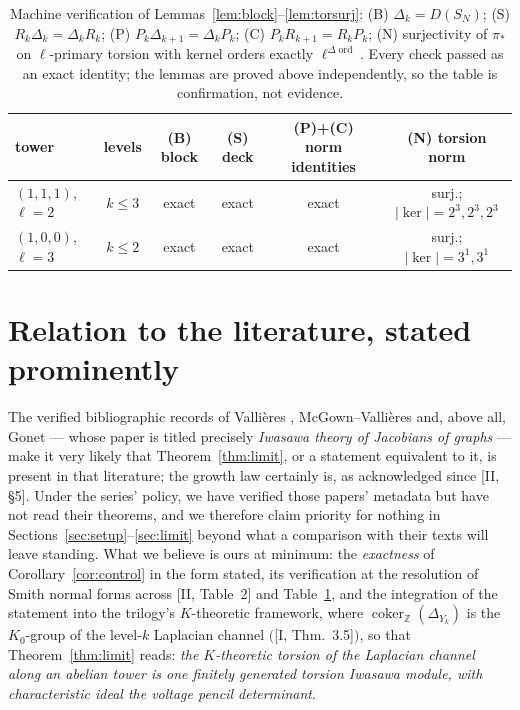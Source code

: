 \documentclass[11pt]{amsart}
\numberwithin{equation}{section}
\theoremstyle{definition}
\theoremstyle{remark}
\newcommand{\Z}{\mathbb{Z}}
\newcommand{\coker}{\operatorname{coker}}
\newcommand{\ord}{\operatorname{ord}}
\begin{document}
\begin{table}[ht]
\centering\small
\renewcommand{\arraystretch}{1.2}
\begin{tabular}{lccccc}
\toprule
tower & levels & (B) block & (S) deck & (P)+(C) norm identities & (N) torsion norm\\
\midrule
$(1,1,1)$, $\ell=2$ & $k\le3$ & exact & exact & exact & surj.; $|\ker|=2^3,2^3,2^3$\\
$(1,0,0)$, $\ell=3$ & $k\le2$ & exact & exact & exact & surj.; $|\ker|=3^1,3^1$\\
\bottomrule
\end{tabular}
\medskip
\caption{Machine verification of Lemmas~\ref{lem:block}--\ref{lem:torsurj}:
(B) $\Delta_k=D(S_N)$; (S) $R_k\Delta_k=\Delta_kR_k$; (P) $P_k\Delta_{k+1}
=\Delta_kP_k$; (C) $P_kR_{k+1}=R_kP_k$; (N) surjectivity of $\pi_*$ on
$\ell$-primary torsion with kernel orders exactly
$\ell^{\Delta\ord}$. Every check passed as an exact identity; the lemmas are proved
above independently, so the table is confirmation, not evidence.}
\label{tab:battery}
\end{table}

\section{Relation to the literature, stated prominently}\label{sec:lit}

The verified bibliographic records of Vallières \cite{Vallieres}, McGown--Vallières
\cite{McGownVallieres} and, above all, Gonet --- whose paper is titled precisely
\emph{Iwasawa theory of Jacobians of graphs} \cite{Gonet} --- make it very likely
that Theorem~\ref{thm:limit}, or a statement equivalent to it, is present in that
literature; the growth law certainly is, as acknowledged since [II, \S5]. Under the
series' policy, we have verified those papers' metadata but have not read their
theorems, and we therefore claim priority for nothing in
Sections~\ref{sec:setup}--\ref{sec:limit} beyond what a comparison with their texts
will leave standing. What we believe is ours at minimum: the \emph{exactness} of
Corollary~\ref{cor:control} in the form stated, its verification at the resolution
of Smith normal forms across [II, Table~2] and Table~\ref{tab:battery}, and the
integration of the statement into the trilogy's $K$-theoretic framework, where
$\coker_\Z(\Delta_{Y_k})$ is the $K_0$-group of the level-$k$ Laplacian channel
$($[I, Thm.~3.5]$)$, so that Theorem~\ref{thm:limit} reads: \emph{the
$K$-theoretic torsion of the Laplacian channel along an abelian tower is one
finitely generated torsion Iwasawa module, with characteristic ideal the voltage
pencil determinant}.
\end{document}
